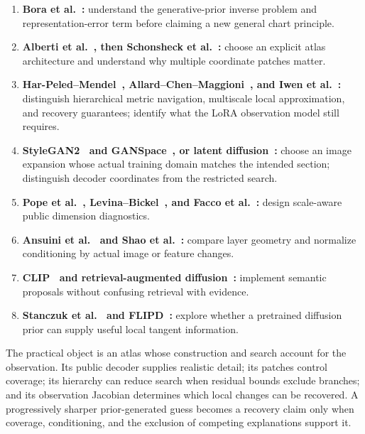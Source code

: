 \documentclass[11pt,a4paper]{article}
\theoremstyle{definition}
\theoremstyle{definition}
\theoremstyle{remark}\newtheorem{remark}[theorem]{Remark}
\begin{document}
\begin{enumerate}
\item \textbf{Bora et al.~\cite{bora}:} understand the generative-prior inverse problem and representation-error term before claiming a new general chart principle.
\item \textbf{Alberti et al.~\cite{mixturevae}, then Schonsheck et al.~\cite{chartae}:} choose an explicit atlas architecture and understand why multiple coordinate patches matter.
\item \textbf{Har-Peled--Mendel~\cite{nettree}, Allard--Chen--Maggioni~\cite{gmra}, and Iwen et al.~\cite{onebitgmra}:} distinguish hierarchical metric navigation, multiscale local approximation, and recovery guarantees; identify what the LoRA observation model still requires.
\item \textbf{StyleGAN2~\cite{stylegan2} and GANSpace~\cite{ganspace}, or latent diffusion~\cite{ldm}:} choose an image expansion whose actual training domain matches the intended section; distinguish decoder coordinates from the restricted search.
\item \textbf{Pope et al.~\cite{pope}, Levina--Bickel~\cite{levina}, and Facco et al.~\cite{twonn}:} design scale-aware public dimension diagnostics.
\item \textbf{Ansuini et al.~\cite{ansuini} and Shao et al.~\cite{riemannian}:} compare layer geometry and normalize conditioning by actual image or feature changes.
\item \textbf{CLIP~\cite{clip} and retrieval-augmented diffusion~\cite{rdm}:} implement semantic proposals without confusing retrieval with evidence.
\item \textbf{Stanczuk et al.~\cite{stanczuk} and FLIPD~\cite{flipd}:} explore whether a pretrained diffusion prior can supply useful local tangent information.
\end{enumerate}

The practical object is an atlas whose construction and search account for the observation. Its public decoder supplies realistic detail; its patches control coverage; its hierarchy can reduce search when residual bounds exclude branches; and its observation Jacobian determines which local changes can be recovered. A progressively sharper prior-generated guess becomes a recovery claim only when coverage, conditioning, and the exclusion of competing explanations support it.
\end{document}
